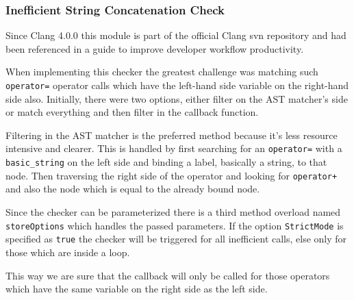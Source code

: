 \subsubsection{Inefficient String Concatenation Check}
\par Since Clang 4.0.0\cite{string_concat_release} this module is part of the official Clang svn repository and had been referenced in a guide to improve developer workflow productivity\cite{string_concat_ref}.
\par When implementing this checker the greatest challenge was matching such \\\verb|operator=| operator calls which have the left-hand side variable on the right-hand side also. Initially, there were two options, either filter on the AST matcher's side or match everything and then filter in the callback function. \medskip
\par Filtering in the AST matcher is the preferred method because it's less resource intensive and clearer. This is handled by first searching for an \verb|operator=| with a \verb|basic_string| on the left side and binding a label, basically a string, to that node. Then traversing the right side of the operator and looking for \verb|operator+| and also the node which is equal to the already bound node. \medskip
\par Since the checker can be parameterized there is a third method overload named \verb|storeOptions| which handles the passed parameters. If the option \verb|StrictMode| is specified as \verb|true| the checker will be triggered for all inefficient calls, else only for those which are inside a loop. \medskip
\par This way we are sure that the callback will only be called for those operators which have the same variable on the right side as the left side.
